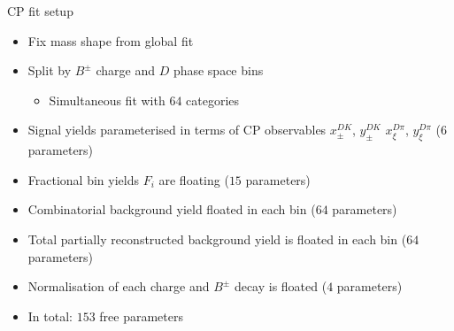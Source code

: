 \documentclass{beamer}
\begin{document}
\begin{frame}{CP fit setup}
  \begin{itemize}
    \setlength\itemsep{0.5em}
    \item{Fix mass shape from global fit}
    \item{Split by $B^\pm$ charge and $D$ phase space bins}
    \begin{itemize}
      \item{Simultaneous fit with $64$ categories}
    \end{itemize}
    \item{Signal yields parameterised in terms of CP observables $x_\pm^{DK}$, $y_\pm^{DK}$ $x_\xi^{D\pi}$, $y_\xi^{D\pi}$ ($6$ parameters)}
    \item{Fractional bin yields $F_i$ are floating ($15$ parameters)}
    \item{Combinatorial background yield floated in each bin ($64$ parameters)}
    \item{Total partially reconstructed background yield is floated in each bin ($64$ parameters)}
    \item{Normalisation of each charge and $B^\pm$ decay is floated ($4$ parameters)}
    \item{In total: $153$ free parameters}
  \end{itemize}
\end{frame}
\end{document}
